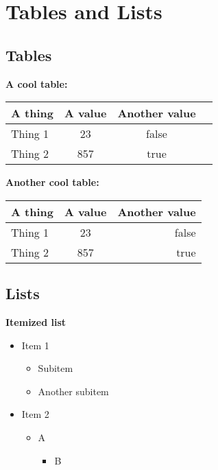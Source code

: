 \section{Tables and Lists} %
\label{sec:tables_and_lists}

\subsection{Tables} %
\label{sub:tables}

\textbf{A cool table:} \par

\begin{center}
	\begin{tabular}[H]{l*{3}{c}}
		\hline
		A thing & A value & Another value \\
		\hline
		Thing 1 & 23 & false \\
		Thing 2 & 857 & true \\
		\hline
	\end{tabular}
\end{center}

\par

\textbf{Another cool table:}\par

\begin{center}
	\begin{tabular}[H]{l | c | r}
		\hline
		A thing & A value & Another value \\
		\hline
		Thing 1 & 23 & false \\
		Thing 2 & 857 & true \\
		\hline
	\end{tabular}
\end{center}


\subsection{Lists} %
\label{sub:lists}

\textbf{Itemized list}

\begin{itemize}
	\item Item 1
		\begin{itemize}
			\item Subitem
			\item Another subitem
		\end{itemize}
	\item Item 2
		\begin{itemize}
			\item A
				\begin{itemize}
					\item B
				\end{itemize}
		\end{itemize}
\end{itemize}

